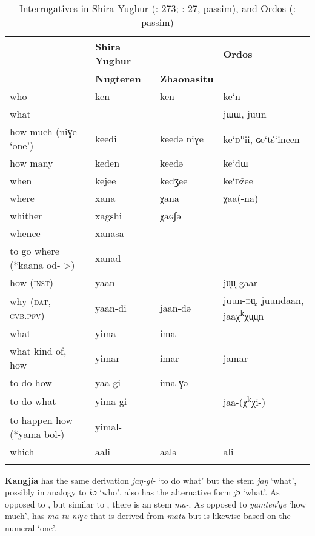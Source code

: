 \begin{table}
\caption{Interrogatives in Shira Yughur (\citealt{Nugteren2003}: 273; \citealt{Zhaonasitu1981b}: 27, passim), and Ordos (\citealt{Mostaert1937}: passim)}
\label{tab:mong:23}

\begin{tabularx}{\textwidth}{Qlll}
\lsptoprule
& \textbf{Shira Yughur} &  & \textbf{Ordos}\\
\midrule
& \textbf{Nugteren} & \textbf{Zhaonasitu} & \\
\midrule
who & ken & ken & ke‘n\\
what &  &  & jɯɯ, juun\\
how much (niɣe ‘one’) & keedi & keedə niɣe & ke‘\textsc{d}\textsuperscript{u}ii, ɢe‘tś‘ineen\\
how many & keden & keedə & ke‘dɯ\\
when & kejee & kedʒee & ke‘\textsc{d}žee\\
where & xana & χana & χaa(-na)\\
whither & xagshi & χaɢʃə & \\
whence & xanasa &  & \\
to go where (*kaana od- >) & xanad- &  & \\
how (\textsc{inst}) & yaan &  & j{u͔}{u͔}-gaar\\
why (\textsc{dat}, \textsc{cvb.pfv}) & yaan-di & jaan-də & juun-\textsc{d}{u͔}, juundaan, jaaχ\textsuperscript{k}χ{u͔}{u͔}n\\
what & yima & ima & \\
what kind of, how & yimar & imar & jamar\\
to do how & yaa-gi- & ima-ɣə- & \\
to do what & yima-gi- &  & jaa-(χ\textsuperscript{k}χi-)\\
to happen how (*yama bol-) & yimal- &  & \\
which & aali & aalə & ali\\
\lspbottomrule
\end{tabularx}
\end{table}

\textbf{Kangjia} has the same derivation \textit{jaŋ-gi-} ‘to do what’ but the stem \textit{jaŋ} ‘what’, possibly in analogy to \textit{kɔ} ‘who’, also has the alternative form \textit{jɔ} ‘what’. As opposed to , but similar to , there is an  stem \textit{ma-}. As opposed to  \textit{yamten’ge} ‘how much’,  has \textit{ma-tu niɣe} that is derived from \textit{matu} but is likewise based on the numeral ‘one’.

